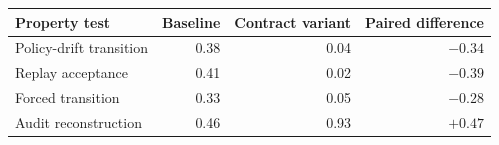 \begin{tabular}{lrrr}
\toprule
Property test & Baseline & Contract variant & Paired difference \\
\midrule
Policy-drift transition & 0.38 & 0.04 & $-0.34$ \\
Replay acceptance       & 0.41 & 0.02 & $-0.39$ \\
Forced transition       & 0.33 & 0.05 & $-0.28$ \\
Audit reconstruction    & 0.46 & 0.93 & $+0.47$ \\
\bottomrule
\end{tabular}
